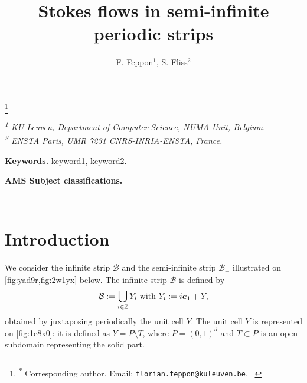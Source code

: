 \documentclass[a4paper,10pt,reqno]{amsart}
\begin{document}
\title{ Stokes flows in semi-infinite periodic strips }
\author{F. Feppon$^{1}$, S. Fliss$^{2}$}
\thanks{\hspace*{0.3em}\textsuperscript{$*$} Corresponding author. Email:
\texttt{florian.feppon@kuleuven.be}. \
\hspace*{\parindent}
}

\maketitle


\vspace{-2em}
\begin{center}
\emph{\textsuperscript{1} KU Leuven, Department of Computer Science, NUMA Unit,
    Belgium.}\\
    \emph{\textsuperscript{2} ENSTA Paris, UMR 7231 CNRS-INRIA-ENSTA,
    France.}
\end{center}

\begin{abstract} 

\end{abstract} 
\medskip  
\noindent \textbf{Keywords.} keyword1, keyword2. 

\medskip
\noindent \textbf{AMS Subject classifications.}  \par
\medskip
\bigskip
\hrule
\tableofcontents
\vspace{-0.5cm}
\hrule
\medskip
\bigskip
\section{Introduction}
    
We consider the infinite strip $\mathcal{B}$ and the semi-infinite strip $\mathcal{B}_+$ illustrated    
on \cref{fig:yad9r,fig:2w1yx} below.
The infinite strip $\mathcal{B}$ is defined by
\[
\mathcal{B}:= \bigcup_{i\in\mathbb{Z}} Y_i \text{ with }Y_i:=i{\bm e}_1 + Y,
\]     
 obtained by juxtaposing periodically
the unit cell $Y$.     
The unit cell $Y$ is represented on \cref{fig:1e8x0}:    
it is defined as $Y=P\setminus \bar T$, where $P=(0,1)^{d}$     
and $T\subset P$ is an open subdomain representing     
the solid part. 
\end{document}
